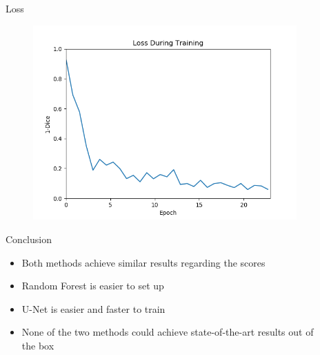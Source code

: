 \documentclass[final]{beamer}
\newlength{\sepwid}
\newlength{\onecolwid}
\newlength{\twocolwid}
\begin{document}
\begin{frame}[t]
\begin{columns}[t]
\begin{column}{\twocolwid}
\begin{columns}[t,totalwidth=\twocolwid]
\end{columns} %

\end{column} %

\begin{column}{\sepwid}\end{column} %

\begin{column}{\onecolwid} %


\begin{block}{Loss}
\begin{figure}
\includegraphics[width=0.9\linewidth]{trainingloss}
\end{figure}

\end{block}

\begin{block}{Conclusion}
\begin{itemize}[label={}]
\item Both methods achieve similar results regarding the scores
\item Random Forest is easier to set up
\item U-Net is easier and faster to train
\item None of the two methods could achieve state-of-the-art results out of the box
\end{itemize}
\end{block}


\end{column}
\end{columns}
\end{frame}
\end{document}
